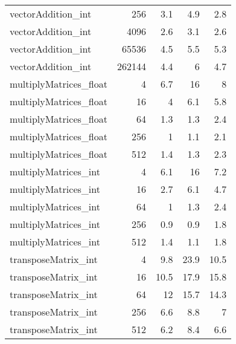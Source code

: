 \begin{tabular}{lrrrr}
 vectorAddition\_int     &    256 &                 3.1 &               4.9 &                 2.8 \\
 vectorAddition\_int     &   4096 &                 2.6 &               3.1 &                 2.6 \\
 vectorAddition\_int     &  65536 &                 4.5 &               5.5 &                 5.3 \\
 vectorAddition\_int     & 262144 &                 4.4 &               6   &                 4.7 \\
 multiplyMatrices\_float &      4 &                 6.7 &              16   &                 8   \\
 multiplyMatrices\_float &     16 &                 4   &               6.1 &                 5.8 \\
 multiplyMatrices\_float &     64 &                 1.3 &               1.3 &                 2.4 \\
 multiplyMatrices\_float &    256 &                 1   &               1.1 &                 2.1 \\
 multiplyMatrices\_float &    512 &                 1.4 &               1.3 &                 2.3 \\
 multiplyMatrices\_int   &      4 &                 6.1 &              16   &                 7.2 \\
 multiplyMatrices\_int   &     16 &                 2.7 &               6.1 &                 4.7 \\
 multiplyMatrices\_int   &     64 &                 1   &               1.3 &                 2.4 \\
 multiplyMatrices\_int   &    256 &                 0.9 &               0.9 &                 1.8 \\
 multiplyMatrices\_int   &    512 &                 1.4 &               1.1 &                 1.8 \\
 transposeMatrix\_int    &      4 &                 9.8 &              23.9 &                10.5 \\
 transposeMatrix\_int    &     16 &                10.5 &              17.9 &                15.8 \\
 transposeMatrix\_int    &     64 &                12   &              15.7 &                14.3 \\
 transposeMatrix\_int    &    256 &                 6.6 &               8.8 &                 7   \\
 transposeMatrix\_int    &    512 &                 6.2 &               8.4 &                 6.6 \\

\end{tabular}

